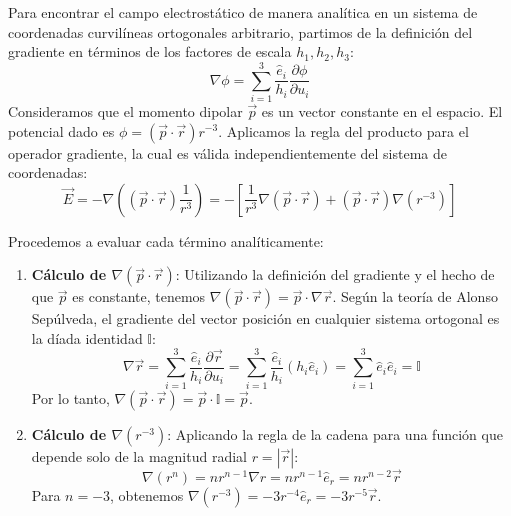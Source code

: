 \documentclass[a4paper]{article}
\begin{document}
Para encontrar el campo electrostático de manera analítica en un sistema de coordenadas curvilíneas ortogonales arbitrario, partimos de la definición del gradiente en términos de los factores de escala $h_1, h_2, h_3$:
\begin{equation}
\nabla \phi = \sum_{i=1}^3 \frac{\hat{e}_i}{h_i} \frac{\partial \phi}{\partial u_i}
\end{equation}
Consideramos que el momento dipolar $\vec{p}$ es un vector constante en el espacio. El potencial dado es $\phi = (\vec{p} \cdot \vec{r})r^{-3}.$ Aplicamos la regla del producto para el operador gradiente, la cual es válida independientemente del sistema de coordenadas:
\begin{equation}
\vec{E} = -\nabla \left( (\vec{p} \cdot \vec{r}) \frac{1}{r^3} \right) = - \left[ \frac{1}{r^3} \nabla(\vec{p} \cdot \vec{r}) + (\vec{p} \cdot \vec{r}) \nabla(r^{-3}) \right]
\end{equation}

Procedemos a evaluar cada término analíticamente:
\begin{enumerate}
    \item \textbf{Cálculo de $\nabla(\vec{p} \cdot \vec{r})$}: Utilizando la definición del gradiente y el hecho de que $\vec{p}$ es constante, tenemos $\nabla(\vec{p} \cdot \vec{r}) = \vec{p} \cdot \nabla\vec{r}$. Según la teoría de Alonso Sepúlveda, el gradiente del vector posición en cualquier sistema ortogonal es la díada identidad $\mathbb{I}$:
    \begin{equation}
    \nabla \vec{r} = \sum_{i=1}^3 \frac{\hat{e}_i}{h_i} \frac{\partial \vec{r}}{\partial u_i} = \sum_{i=1}^3 \frac{\hat{e}_i}{h_i} (h_i \hat{e}_i) = \sum_{i=1}^3 \hat{e}_i \hat{e}_i = \mathbb{I}
    \end{equation}
    Por lo tanto, $\nabla(\vec{p} \cdot \vec{r}) = \vec{p} \cdot \mathbb{I} = \vec{p}$.

    \item \textbf{Cálculo de $\nabla(r^{-3})$}: Aplicando la regla de la cadena para una función que depende solo de la magnitud radial $r = |\vec{r}|$:
    \begin{equation}
    \nabla(r^n) = n r^{n-1} \nabla r = n r^{n-1} \hat{e}_r = n r^{n-2} \vec{r}
    \end{equation}
    Para $n = -3$, obtenemos $\nabla(r^{-3}) = -3 r^{-4} \hat{e}_r = -3 r^{-5} \vec{r}$.
\end{enumerate}
\end{document}

